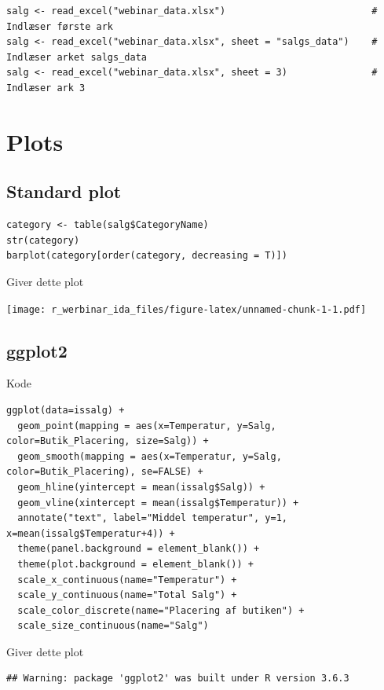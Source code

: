 \documentclass[
]{book}
\begin{document}
\begin{verbatim}
salg <- read_excel("webinar_data.xlsx")                          # Indlæser første ark
salg <- read_excel("webinar_data.xlsx", sheet = "salgs_data")    # Indlæser arket salgs_data
salg <- read_excel("webinar_data.xlsx", sheet = 3)               # Indlæser ark 3
\end{verbatim}

\hypertarget{plots}{%
\chapter{Plots}\label{plots}}

\hypertarget{standard-plot}{%
\section{Standard plot}\label{standard-plot}}

\begin{verbatim}
category <- table(salg$CategoryName)
str(category)
barplot(category[order(category, decreasing = T)])
\end{verbatim}

Giver dette plot

\texttt{[image: r\_werbinar\_ida\_files/figure-latex/unnamed-chunk-1-1.pdf]}

\hypertarget{ggplot2}{%
\section{ggplot2}\label{ggplot2}}

Kode

\begin{verbatim}
ggplot(data=issalg) +
  geom_point(mapping = aes(x=Temperatur, y=Salg, color=Butik_Placering, size=Salg)) +
  geom_smooth(mapping = aes(x=Temperatur, y=Salg, color=Butik_Placering), se=FALSE) +
  geom_hline(yintercept = mean(issalg$Salg)) +
  geom_vline(xintercept = mean(issalg$Temperatur)) +
  annotate("text", label="Middel temperatur", y=1, x=mean(issalg$Temperatur+4)) +
  theme(panel.background = element_blank()) +
  theme(plot.background = element_blank()) +
  scale_x_continuous(name="Temperatur") +
  scale_y_continuous(name="Total Salg") +
  scale_color_discrete(name="Placering af butiken") +
  scale_size_continuous(name="Salg")
\end{verbatim}

Giver dette plot

\begin{verbatim}
## Warning: package 'ggplot2' was built under R version 3.6.3
\end{verbatim}
\end{document}
